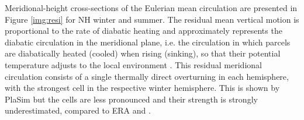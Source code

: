 \documentclass[12pt,a4paper,twoside,openright,headinclude,liststotoc,bibtotoc]{scrreprt}
\begin{document}
Meridional-height cross-sections of the Eulerian mean circulation are presented in Figure \ref{img:resi} for NH winter and summer. The residual mean vertical motion is proportional to the rate of diabatic heating and approximately represents the diabatic circulation in the meridional plane, i.e. the circulation in which parcels are diabatically heated (cooled) when rising (sinking), so that their potential temperature adjusts to the local environment \citep{Holton1992}. This residual meridional circulation consists of a single thermally direct overturning in each hemisphere, with the strongest cell in the respective winter hemisphere. This is shown by PlaSim but the cells are less pronounced and their strength is strongly underestimated, compared to ERA and \citet[p. 325]{Holton1992}.
\end{document}
